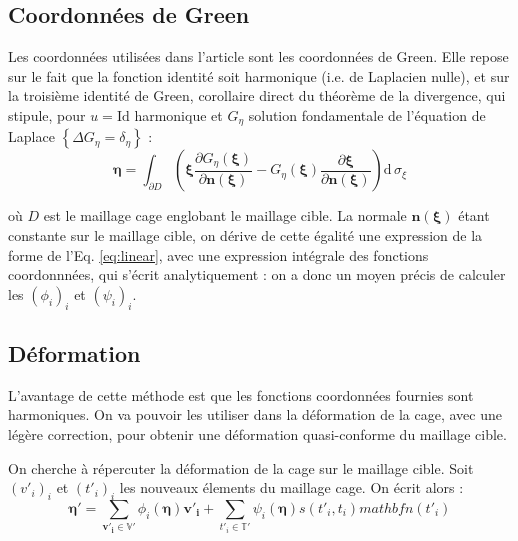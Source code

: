 \documentclass[10pt,a4paper]{article}
\begin{document}
\subsection{Coordonnées de Green}

Les coordonnées utilisées dans l'article sont les coordonnées de Green. Elle repose sur le fait que la fonction identité soit harmonique (i.e. de Laplacien nulle), et sur la troisième identité de Green, corollaire direct du théorème de la divergence, qui stipule, pour $u = \mathrm{Id}$ harmonique et $G_\eta$ solution fondamentale de l'équation de Laplace $\left\lbrace \Delta G_\eta = \delta_\eta \right\rbrace$ :
\begin{equation}
\boldsymbol\eta = \int_{\partial D} \left(
	\boldsymbol\xi
		\frac{\partial G_\eta \left(\boldsymbol\xi \right)}
		{\partial \mathbf{n \left( \boldsymbol\xi \right)}}
	- G_\eta \left( \boldsymbol\xi \right) 
		\frac{\partial \boldsymbol\xi }
		{\partial \mathbf{n \left( \boldsymbol\xi \right)}}
\right)
\mathrm{d}\, \sigma_\xi
\end{equation}

où $D$ est le maillage cage englobant le maillage cible. La normale $\mathbf{n \left( \boldsymbol\xi \right)}$ étant constante sur le maillage cible, on dérive de cette égalité une expression de la forme de l'Eq. \ref{eq:linear}, avec une expression intégrale des fonctions coordonnnées, qui s'écrit analytiquement : on a donc un moyen précis de calculer les $\left( \phi_i \right)_i$ et $\left( \psi_i \right)_i$.

\subsection{Déformation}

L'avantage de cette méthode est que les fonctions coordonnées fournies sont harmoniques. On va pouvoir les utiliser dans la déformation de la cage, avec une légère correction, pour obtenir une déformation quasi-conforme du maillage cible.

On cherche à répercuter la déformation de la cage sur le maillage cible. Soit $\left( v'_i \right)_i$ et $\left( t'_i \right)_i$ les nouveaux élements du maillage cage. On écrit alors :
\begin{equation}
\mathbf{\eta'} = \sum_{\mathbf{v'_i} \in \mathbb{V}'} \phi_i \left( \mathbf{\eta} \right) \mathbf{v'_i} 
+ \sum_{t'_i \in \mathbb{T}'} \psi_i \left( \mathbf{\eta} \right) s \left(t'_i, t_i \right) mathbf{n} \left( t'_i \right)
\end{equation}
\end{document}
